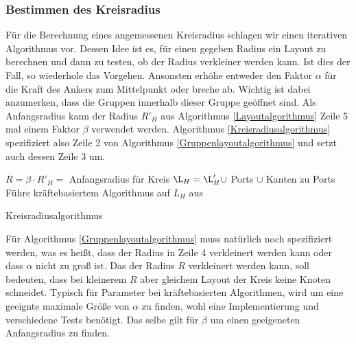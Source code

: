 \subsubsection{Bestimmen des Kreisradius}
Für die Berechnung eines angemessenen Kreisradius schlagen wir einen iterativen Algorithmus vor. Dessen Idee ist es, für einen gegeben Radius ein Layout zu berechnen und dann zu testen, ob der Radius verkleiner werden kann. Ist dies der Fall, so wiederhole das Vorgehen. Ansonsten erhöhe entweder den Faktor $\alpha$ für die Kraft des Ankers zum Mittelpunkt oder breche ab. Wichtig ist dabei anzumerken, dass die Gruppen innerhalb dieser Gruppe geöffnet sind.
Als Anfangsradius kann der Radius $R'_H$ aus Algorithmus \ref{Layoutalgorithmus} Zeile 5 mal einem Faktor $\beta$ verwendet werden.
Algorithmus \ref{Kreisradiusalgorithmus} spezifiziert also Zeile 2 von Algorithmus  \ref{Gruppenlayoutalgorithmus} und setzt auch dessen Zeile 3 um.

\begin{algorithm}[H]
\label{Kreisradiusalgorithmus}
\SetAlgoLined
{}
$R = \beta \cdot R'_H = $ Anfangsradius für Kreis\;
$\L_H = \L'_H \cup$ Ports $\cup$  Kanten zu Ports\;
Führe kräftebasiertem Algorithmus auf  $L_H$ aus\;
\caption{Kreisradiusalgorithmus}
\end{algorithm}

Für Algorithmus \ref{Gruppenlayoutalgorithmus} muss natürlich noch spezifiziert werden, was es heißt, dass der Radius in Zeile 4 verkleinert werden kann oder dass $\alpha$ nicht zu groß ist. Das der Radius $R$ verkleinert werden kann, soll bedeuten, dass bei kleinerem $R$ aber gleichem Layout der Kreis keine Knoten schneidet. Typisch für Parameter bei kräftebasierten Algorithmen, wird um eine geeignte maximale Größe von $\alpha$ zu finden, wohl eine Implementierung und verschiedene Tests benötigt. Das selbe gilt für $\beta$ um einen geeigeneten Anfangsradius zu finden.
	
